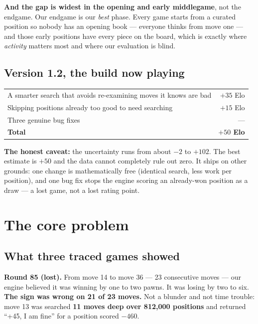 \documentclass[11pt,a4paper]{article}
\newcommand{\good}[1]{\textcolor{teal!70!black}{\textbf{#1}}}
\begin{document}
\textbf{And the gap is widest in the opening and early middlegame}, not the endgame. Our endgame
is our \emph{best} phase. Every game starts from a curated position so nobody has an opening
book --- everyone thinks from move one --- and those early positions have every piece on the
board, which is exactly where \emph{activity} matters most and where our evaluation is blind.

\subsection{Version 1.2, the build now playing}

\begin{center}
\begin{tabular}{lr}
\toprule
A smarter search that avoids re-examining moves it knows are bad & $+35$ Elo \\
Skipping positions already too good to need searching & $+15$ Elo \\
Three genuine bug fixes & --- \\
\midrule
\textbf{Total} & \good{$+50$ Elo} \\
\bottomrule
\end{tabular}
\end{center}

\textbf{The honest caveat:} the uncertainty runs from about $-2$ to $+102$. The best estimate is
$+50$ and the data cannot completely rule out zero. It ships on other grounds: one change is
mathematically free (identical search, less work per position), and one bug fix stops the engine
scoring an already-won position as a draw --- a lost game, not a lost rating point.

\section{The core problem}

\subsection{What three traced games showed}

\textbf{Round 85 (lost).} From move 14 to move 36 --- 23 consecutive moves --- our engine believed
it was winning by one to two pawns. It was losing by two to six. \textbf{The sign was wrong on 21
of 23 moves.} Not a blunder and not time trouble: move 13 was searched \textbf{11 moves deep over
812,000 positions} and returned ``+45, I am fine'' for a position scored $-460$.
\end{document}
